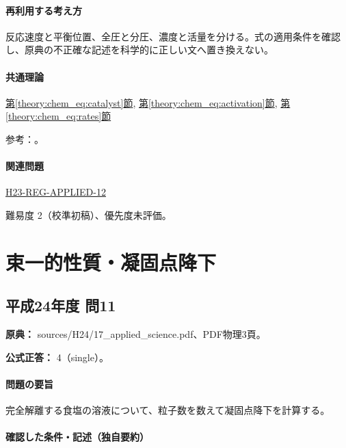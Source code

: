 \paragraph{再利用する考え方} 反応速度と平衡位置、全圧と分圧、濃度と活量を分ける。式の適用条件を確認し、原典の不正確な記述を科学的に正しい文へ置き換えない。

\paragraph{共通理論} \hyperref[theory:chem_eq:catalyst]{第\ref*{theory:chem_eq:catalyst}節}, \hyperref[theory:chem_eq:activation]{第\ref*{theory:chem_eq:activation}節}, \hyperref[theory:chem_eq:rates]{第\ref*{theory:chem_eq:rates}節}

\par 参考：\cite{iupac_greenbook2012}。

\paragraph{関連問題} \hyperref[q:h23-reg-applied-12]{H23-REG-APPLIED-12}

\par 難易度 2（校準初稿）、優先度未評価。

\section{束一的性質・凝固点降下}

\subsection{平成24年度 問11}
\label{q:h24-reg-applied-11}

\noindent\textbf{原典：} sources/H24/17\_applied\_science.pdf、PDF物理3頁。

\textbf{公式正答：} 4（single）。

\paragraph{問題の要旨} 完全解離する食塩の溶液について、粒子数を数えて凝固点降下を計算する。

\paragraph{確認した条件・記述（独自要約）}\mbox{}\par

